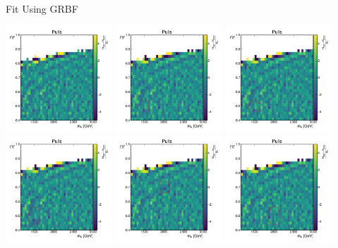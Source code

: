 \documentclass[10pt]{beamer}
\begin{document}
\begin{frame}{Fit Using GRBF}
  \begin{center}
    \includegraphics[width=0.3\textwidth]{figures/2dpullplots/grbf/E_1200_0p5_100_0p05.pdf} 
    \includegraphics[width=0.3\textwidth]{figures/2dpullplots/grbf/E_1500_0p5_100_0p05.pdf} 
    \includegraphics[width=0.3\textwidth]{figures/2dpullplots/grbf/E_1500_0p5_150_0p05.pdf} 
    \includegraphics[width=0.3\textwidth]{figures/2dpullplots/grbf/E_1500_0p5_150_0p07.pdf} 
    \includegraphics[width=0.3\textwidth]{figures/2dpullplots/grbf/E_2000_0p7_150_0p05.pdf} 
    \includegraphics[width=0.3\textwidth]{figures/2dpullplots/grbf/E_2000_0p5_150_0p07.pdf} 
  \end{center}
\end{frame}
\end{document}
